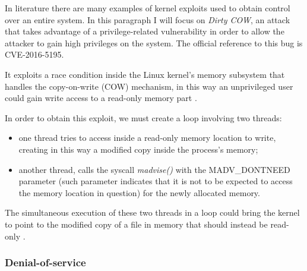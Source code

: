 \documentclass[a4paper,12pt]{article}
\begin{document}
In literature there are many examples of kernel exploits used to obtain control
over an entire system. In this paragraph I will focus on \textit{Dirty COW}, an
attack that takes advantage of a privilege-related vulnerability in order to
allow the attacker to gain high privileges on the system. The official reference
to this bug is CVE-2016-5195.\par It exploits a race condition inside the Linux
kernel's memory subsystem that handles the copy-on-write (COW) mechanism, in
this way an unprivileged user could gain write access to a read-only memory part
\cite{red_hat_dirtycow}.\par In order to obtain this exploit, we must create a
loop involving two threads:
\begin{itemize}
  \item one thread tries to access inside a read-only memory location to
  write, creating in this way a modified copy inside the process's memory;
  \item another thread, calls the syscall \textit{madvise()}
  \cite{madvise_description} with the MADV\_DONTNEED parameter (such parameter
  indicates that it is not to be expected to access the memory location in
  question) for the newly allocated memory.
  \end{itemize}
The simultaneous execution of these two threads in a loop could bring the
kernel to point to the modified copy of a file in memory that should instead be
read-only \cite{dirtycow_how_it_worrks}.

\subsubsection{Denial-of-service}
\end{document}
